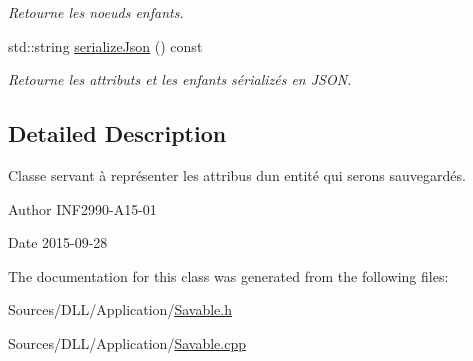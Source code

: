 \begin{DoxyCompactItemize}
\begin{DoxyCompactList}\small\item\em Retourne les noeuds enfants. \end{DoxyCompactList}\item 
std\+::string \hyperlink{group__inf2990_ga454a7c175c0864c3656283bafcb8413e}{serialize\+Json} () const 
\begin{DoxyCompactList}\small\item\em Retourne les attributs et les enfants sérializés en J\+S\+O\+N. \end{DoxyCompactList}\end{DoxyCompactItemize}


\subsection{Detailed Description}
Classe servant à représenter les attribus d\textquotesingle{}un entité qui serons sauvegardés. 

\begin{DoxyAuthor}{Author}
I\+N\+F2990-\/\+A15-\/01 
\end{DoxyAuthor}
\begin{DoxyDate}{Date}
2015-\/09-\/28 
\end{DoxyDate}


The documentation for this class was generated from the following files\+:\begin{DoxyCompactItemize}
\item 
Sources/\+D\+L\+L/\+Application/\hyperlink{_savable_8h}{Savable.\+h}\item 
Sources/\+D\+L\+L/\+Application/\hyperlink{_savable_8cpp}{Savable.\+cpp}\end{DoxyCompactItemize}
